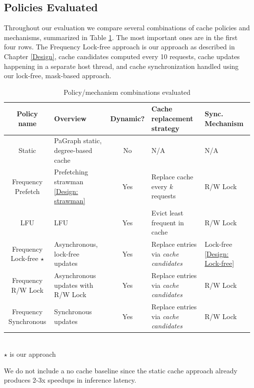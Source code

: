 \subsection{Policies Evaluated}
Throughout our evaluation we compare several combinations of cache policies and mechanisms, summarized in Table \ref{Eval: Policy names}. 
The most important ones are in the first four rows. 
The Frequency Lock-free approach is our approach as described in Chapter \ref{Design}, cache candidates computed every 10 requests, cache updates happening in a separate host thread, and cache synchronization handled using our lock-free, mask-based approach.
\begin{table}[h!]
    \begin{center}
        \begin{tabularx}{\textwidth}{|c X c X X|} 
        \hline
        \textbf{Policy name} & \textbf{Overview} & \textbf{Dynamic?} & \textbf{Cache replacement strategy} & \textbf{Sync. Mechanism}\\ [0.5ex] 
        \hline\hline
        Static & PaGraph static, degree-based cache & No & N/A & N/A \\
        \hline
        Frequency Prefetch & Prefetching strawman \ref{Design: strawman} & Yes & Replace cache every $k$ requests & R/W Lock \\
        \hline
        LFU & LFU & Yes & Evict least frequent in cache & R/W Lock \\
        \hline
        Frequency Lock-free $\star$ & Asynchronous, lock-free updates & Yes & Replace entries via \textit{cache candidates} & Lock-free \ref{Design: Lock-free} \\
        \hline
        Frequency R/W Lock & Asynchronous updates with R/W Lock & Yes & Replace entries via \textit{cache candidates} & R/W Lock \\
        \hline
        Frequency Synchronous & Synchronous updates & Yes & Replace entries via \textit{cache candidates} & R/W Lock \\
        \hline
        \end{tabularx} \\
        $\star$ is our approach
    \end{center}
    \caption{Policy/mechanism combinations evaluated}
    \label{Eval: Policy names}
\end{table}
We do not include a no cache baseline since the static cache approach already produces 2-3x speedups in inference latency.

